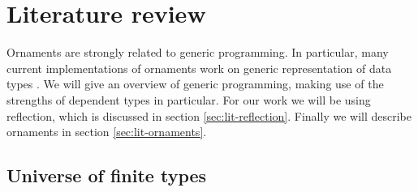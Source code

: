 \section{Literature review}\label{sec:lit}

Ornaments are strongly related to generic programming.
In particular, many current implementations of ornaments work on
generic representation of data types \cite{dagand12,dagand14-essence,dagand14-transporting}.
We will give an overview of generic programming, making use of the
strengths of dependent types in particular.
For our work we will be using reflection, which is discussed in
section \ref{sec:lit-reflection}.
Finally we will describe ornaments in section
\ref{sec:lit-ornaments}.



\subsection{Universe of finite types}

